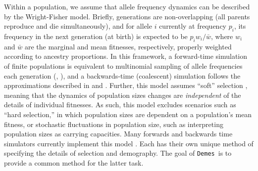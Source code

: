 \documentclass[11pt]{article}
\newcommand{\Demes}[0]{\texttt{Demes}}
\newcommand{\krtcomment}[1]{{\textcolor{purple}{KRT: #1}}}
\newcommand{\mhcomment}[1]{{\textcolor{cyan}{MH: #1}}}
\begin{document}
Within a population, we assume that allele frequency dynamics can
be described by the Wright-Fisher model.
Briefly, generations are non-overlapping (all parents
reproduce and die simultaneously), and for allele $i$ currently at frequency $p_i$,
its frequency in the next generation (at birth) is expected to be $p_iw_i/\bar{w}$,
where $w_i$ and $\bar{w}$ are the marginal and
mean fitnesses, respectively, properly weighted according to ancestry proportions.
In this framework,
a forward-time simulation of finite populations is equivalent
to multinomial sampling of allele frequencies each
generation (\citet[][pp 29-31]{burger2000-ul}, \citet[][pp 179-181]{crowkimura1970}),
and a backwards-time (coalescent) simulation follows the approximations
described in \citet{tajima1983evolutionary,hudson1983testing}
and \citet[][chapter 3]{wakeley2008-hd}.
Further, this model assumes ``soft'' selection \citep{christiansen1975hard},
meaning that the dynamics of population sizes
changes are \textit{independent} of the details of individual fitnesses.
As such, this model excludes scenarios such as ``hard selection,''
in which population sizes are dependent on a population's mean fitness, or
stochastic fluctuations in population size, such as interpreting
population sizes as carrying capacities.
Many forwards and backwards time simulators currently implement this model
\citep[e.g.,][]{hudson2002generating,gutenkunst2009inferring,excoffier2011fastsimcoal,kelleher2016efficient,jouganous2017inferring,haller2019slim,thornton2019-nu}.
Each has their own unique method of specifying the details of selection and demography.
The goal of \Demes\ is to provide a common method for the latter task.  

\end{document}
